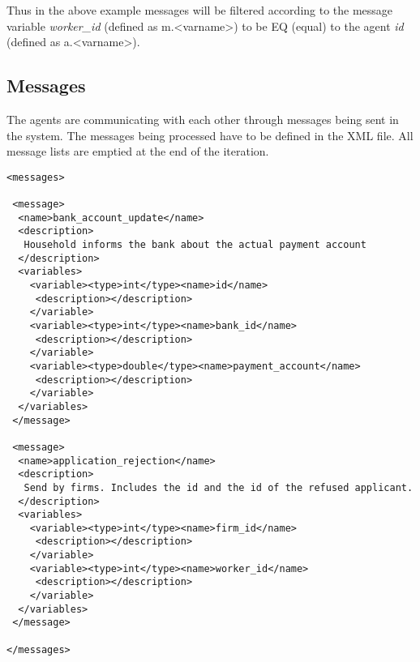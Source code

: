 Thus in the above example messages will be filtered according to the
message variable \emph{worker\_id} (defined as m.<varname>) to be EQ
(equal) to the agent \emph{id} (defined as a.<varname>).

\subsection{Messages}

The agents are communicating with each other through messages being
sent in the system. The messages being processed have to be defined
in the XML file. All message lists are emptied at the end of the
iteration.

\begin{mylisting}
\begin{verbatim}
<messages>

 <message>
  <name>bank_account_update</name>
  <description>
   Household informs the bank about the actual payment account
  </description>
  <variables>
    <variable><type>int</type><name>id</name>
     <description></description>
    </variable>
    <variable><type>int</type><name>bank_id</name>
     <description></description>
    </variable>
    <variable><type>double</type><name>payment_account</name>
     <description></description>
    </variable>
  </variables>
 </message>

 <message>
  <name>application_rejection</name>
  <description>
   Send by firms. Includes the id and the id of the refused applicant.
  </description>
  <variables>
    <variable><type>int</type><name>firm_id</name>
     <description></description>
    </variable>
    <variable><type>int</type><name>worker_id</name>
     <description></description>
    </variable>
  </variables>
 </message>

</messages>
\end{verbatim}
\end{mylisting}
